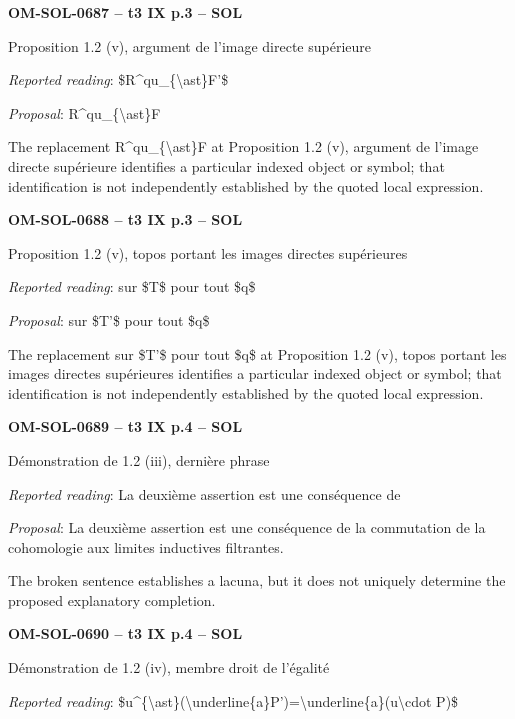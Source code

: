 \par\noindent\textbf{OM-SOL-0687 -- t3 IX p.3 -- SOL}\par
Proposition 1.2 (v), argument de l'image directe supérieure\par
\emph{Reported reading}: \$R\textasciicircum{}qu\_\{\textbackslash{}ast\}F'\$\par
\emph{Proposal}: R\textasciicircum{}qu\_\{\textbackslash{}ast\}F\par
The replacement R\textasciicircum{}qu\_\{\textbackslash{}ast\}F at Proposition 1.2 (v), argument de l'image directe supérieure identifies a particular indexed object or symbol; that identification is not independently established by the quoted local expression.\par
\par\noindent\textbf{OM-SOL-0688 -- t3 IX p.3 -- SOL}\par
Proposition 1.2 (v), topos portant les images directes supérieures\par
\emph{Reported reading}: sur \$T\$ pour tout \$q\$\par
\emph{Proposal}: sur \$T'\$ pour tout \$q\$\par
The replacement sur \$T'\$ pour tout \$q\$ at Proposition 1.2 (v), topos portant les images directes supérieures identifies a particular indexed object or symbol; that identification is not independently established by the quoted local expression.\par
\par\noindent\textbf{OM-SOL-0689 -- t3 IX p.4 -- SOL}\par
Démonstration de 1.2 (iii), dernière phrase\par
\emph{Reported reading}: La deuxième assertion est une conséquence de\par
\emph{Proposal}: La deuxième assertion est une conséquence de la commutation de la cohomologie aux limites inductives filtrantes.\par
The broken sentence establishes a lacuna, but it does not uniquely determine the proposed explanatory completion.\par
\par\noindent\textbf{OM-SOL-0690 -- t3 IX p.4 -- SOL}\par
Démonstration de 1.2 (iv), membre droit de l'égalité\par
\emph{Reported reading}: \$u\textasciicircum{}\{\textbackslash{}ast\}(\textbackslash{}underline\{a\}P')=\allowbreak \textbackslash{}underline\{a\}(u\textbackslash{}cdot P)\$\par
